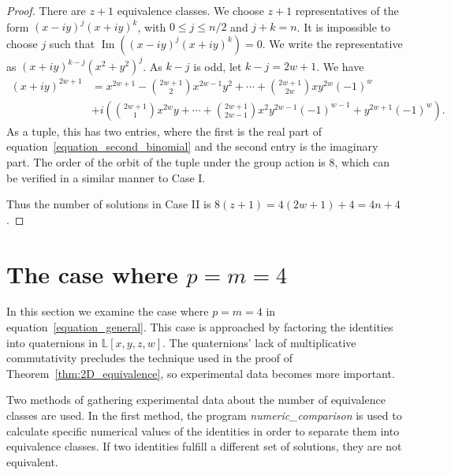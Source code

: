 \documentclass[12pt,table]{article}
\theoremstyle{definition}
\theoremstyle{remark}
\newcommand{\Lll}{\mathbb L}
\numberwithin{equation}{section}
\DeclareMathOperator{\Imag}{Im}
\newcommand{\myfrac}[2]{#1 / #2}
\begin{document}
\begin{proof}
There are $ z + 1 $ equivalence classes. We choose $ z + 1 $
representatives of the form $ (x - iy)^j (x + iy)^k $, with
$ 0 \leq j \leq \myfrac{n}{2}$ and $ j + k = n $.
It is impossible to
choose $ j $ such that $ \Imag\left( (x - iy)^j (x + iy)^k \right) = 0$.
We write the representative as $ (x + iy)^{k-j} (x^2 + y^2)^j $.
As $ k - j $ is odd, let $ k - j = 2w + 1 $. We have
\begin{align}
\label{equation_second_binomial}
(x + iy) ^ {2w + 1} &= x ^ {2w + 1} - \binom{2w+1}{2}  x^{2w - 1 } y^2
+ \dotsb + \binom{2w+1}{2w} x y^{2w} (-1) ^ {w} \nonumber
\\
&+ i \left( \binom{2w+1}{1} x ^ {2w} y + \dotsb +
\binom{2w+1}{2w-1}  x^2 y ^ {2w -1} (-1)^{w-1}
+  y^{2w+1} (-1) ^ {w}
\right).
\end{align}
As a tuple, this has two entries, where the first is the real part
of equation~\eqref{equation_second_binomial} and the second entry
is the imaginary part.
The order of the orbit of the tuple under the group action is 8, which can be
verified in a similar manner to Case I.

Thus the number of solutions in Case II is $ 8(z + 1) = 4 ( 2w + 1) + 4 = 4n + 4 $.
\end{proof}




\section{The case where $p = m = 4$}
\label{sec:4D}

In this section we examine the case where
$p = m = 4$ in equation~\eqref{equation_general}.
This case is approached by factoring the identities
into quaternions in $\Lll[x,y,z,w]$. The quaternions'
lack of multiplicative commutativity precludes the 
technique used in the proof of Theorem~\ref{thm:2D_equivalence},
so experimental data becomes more important.


Two methods of gathering experimental data about the 
number of equivalence classes are used. 
In the first method,
the program \emph{numeric\_comparison}
is used to calculate specific numerical values of 
the identities in order to 
separate them into equivalence classes.
If two identities fulfill
a different set of solutions, they are
not equivalent.
\end{document}

